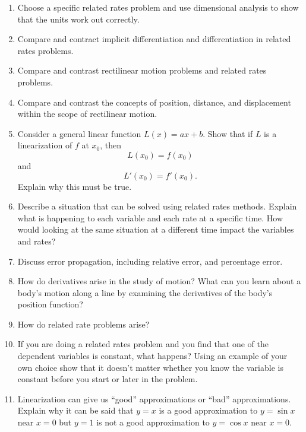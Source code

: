 \begin{enumerate}
\item  Choose a specific related rates problem and use dimensional analysis to show that the units work out correctly.

\item  Compare and contract implicit differentiation and differentiation in related rates problems.

\item  Compare and contrast rectilinear motion problems and related rates problems.

\item  Compare and contrast the concepts of position, distance, and displacement within the scope of rectilinear motion.

\item  Consider a general linear function $L(x) = ax + b$.  Show that if $L$ is a linearization of $f$ at $x_0$, then $$L\left( {x_0 } \right) = f\left( {x_0 } \right)$$ and $$L'\left( {x_0 } \right) = f'\left( {x_0 } \right).$$  Explain why this must be true.

\item  Describe a situation that can be solved using related rates methods.  Explain what is happening to each variable and each rate at a specific time.  How would looking at the same situation at a different time impact the variables and rates?

\item  Discuss error propagation, including relative error, and percentage error.   \cite{SBS}

\item  How do derivatives arise in the study of motion?  What can you learn about a body's motion along a line by examining the derivatives of the body's position function?   \cite{FWG}

\item  How do related rate problems arise?   \cite{FWG}

\item  If you are doing a related rates problem and you find that one of the dependent variables is constant, what happens?  Using an example of your own choice show that it doesn't matter whether you know the variable is constant before you start or later in the problem.

\item  Linearization can give us ``good'' approximations or ``bad'' approximations.  Explain why it can be said that $y = x$ is a good approximation to $y = \sin x$ near $x = 0$ but $y = 1$ is not a good approximation to $y = \cos x$ near $x = 0$.   \cite{SM}


\end{enumerate}
